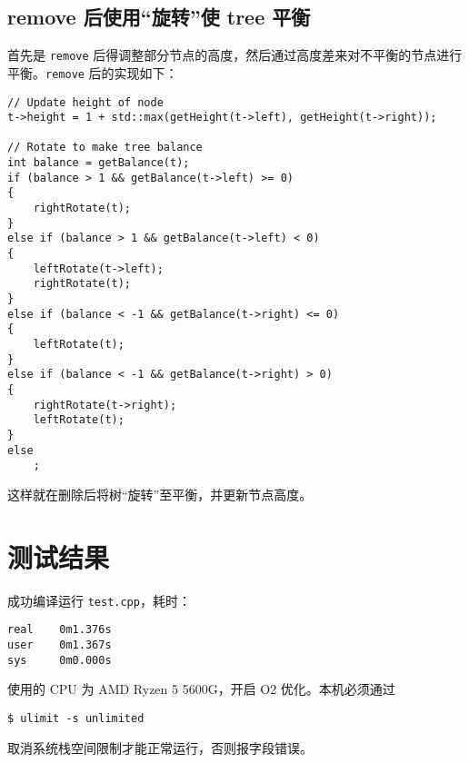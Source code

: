 \documentclass[UTF8]{ctexart}
\begin{document}
\subsection{remove 后使用“旋转”使 tree 平衡}
首先是 \verb|remove| 后得调整部分节点的高度，然后通过高度差来对不平衡的节点进行平衡。\verb|remove| 后的实现如下：

\begin{lstlisting}
// Update height of node
t->height = 1 + std::max(getHeight(t->left), getHeight(t->right));

// Rotate to make tree balance
int balance = getBalance(t);
if (balance > 1 && getBalance(t->left) >= 0)
{
    rightRotate(t);
}
else if (balance > 1 && getBalance(t->left) < 0)
{
    leftRotate(t->left);
    rightRotate(t);
}
else if (balance < -1 && getBalance(t->right) <= 0)
{
    leftRotate(t);
}
else if (balance < -1 && getBalance(t->right) > 0)
{
    rightRotate(t->right);
    leftRotate(t);
}
else
    ;
\end{lstlisting}

这样就在删除后将树“旋转”至平衡，并更新节点高度。

\section{测试结果}

成功编译运行 \verb|test.cpp|，耗时：

\begin{verbatim}
real    0m1.376s
user    0m1.367s
sys     0m0.000s
\end{verbatim}

使用的 CPU 为 AMD Ryzen 5 5600G，开启 O2 优化。本机必须通过

\begin{verbatim}
$ ulimit -s unlimited
\end{verbatim}

取消系统栈空间限制才能正常运行，否则报字段错误。
\end{document}
